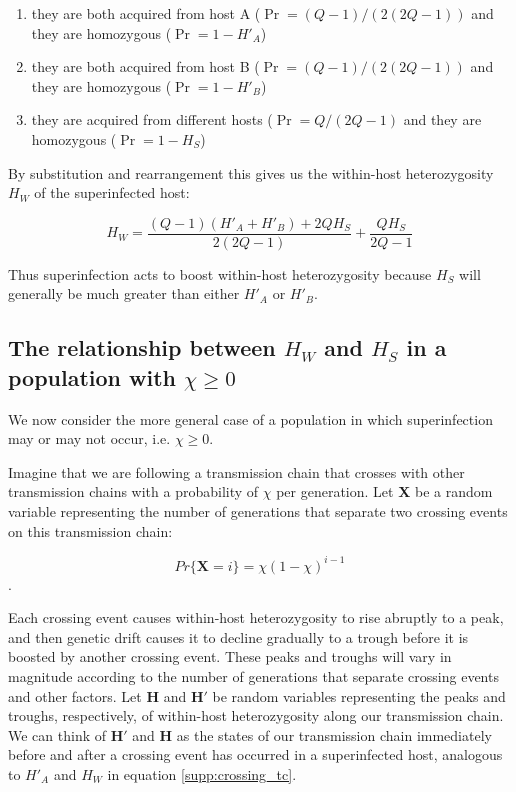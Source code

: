 \documentclass[_main.tex]{subfiles}
\begin{document}
\begin{enumerate}

\item they are both acquired from host A ($ \Pr = (Q-1)/(2(2Q-1))$ and they are homozygous ($ \Pr = 1- H'_A$)

\item they are both acquired from host B ($ \Pr = (Q-1)/(2(2Q-1))$ and they are homozygous ($ \Pr = 1- H'_B$)

\item they are acquired from different hosts ($ \Pr = Q / (2Q-1)$ and they are homozygous ($ \Pr = 1- H_S$)

\end{enumerate}

By substitution and rearrangement this gives us the within-host heterozygosity $H_W$ of the superinfected host:

\begin{equation}
H_W =
\frac{(Q-1) (H'_A + H'_B) + 2 Q H_S}{2(2Q-1)}
+ \frac{Q H_S}{2Q-1}
\label{supp:crossing_tc}
\end{equation}

Thus superinfection acts to boost within-host heterozygosity because $H_S$ will generally be much greater than either $H'_A$ or $H'_B$.  

\subsection{The relationship between \texorpdfstring{$H_W$ and $H_S$}{Hw and Hs} in a population with \texorpdfstring{$\chi \geq 0$}{chi>=0}}
\label{derive_hwhs_1}

We now consider the more general case of a population in which superinfection may or may not occur, i.e. $\chi \geq 0$.  

Imagine that we are following a transmission chain that crosses with other transmission chains with a probability of $\chi$ per generation.  Let \textbf{X} be a random variable representing the number of generations that separate two crossing events on this transmission chain: 

\begin{equation}
Pr \{ \textbf{X} = i \} = \chi (1- \chi)^{i-1}
\label{eq:supp_xprobdist}
\end{equation}.

Each crossing event causes within-host heterozygosity to rise abruptly to a peak, and then genetic drift causes it to decline gradually to a trough before it is boosted by another crossing event.  These peaks and troughs will vary in magnitude according to the number of generations that separate crossing events and other factors.  Let $\mathbf{H}$ and  $\mathbf{H'}$ be random variables representing the peaks and troughs, respectively, of within-host heterozygosity along our transmission chain.  We can think of $\mathbf{H'}$ and $\mathbf{H}$ as the states of our transmission chain immediately before and after a crossing event has occurred in a superinfected host, analogous to $H'_A$ and $H_W$ in equation \ref{supp:crossing_tc}.
\end{document}
